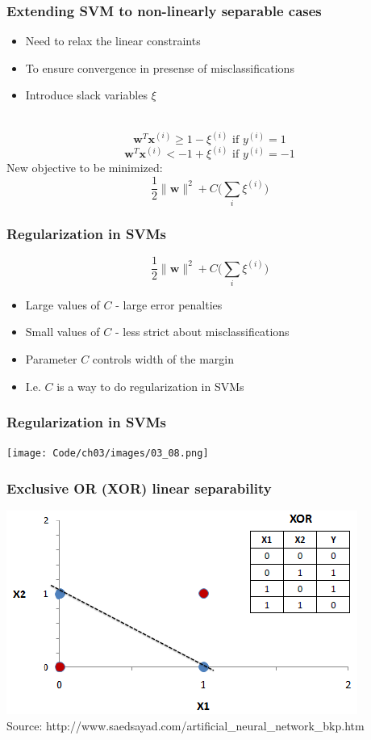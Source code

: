\documentclass{beamer}
\begin{document}
\begin{frame}
  \frametitle{Extending SVM to non-linearly separable cases}
  \begin{itemize}
  \item Need to relax the linear constraints
  \item To ensure convergence in presense of misclassifications
  \item Introduce slack variables $\xi$
  \end{itemize}
  \\
  \[
  \mathbf{w}^T \mathbf{x}^{(i)} \ge 1 - \xi^{(i)} \text{ if } y^{(i)} = 1
  \]
  \[
  \mathbf{w}^T \mathbf{x}^{(i)} < -1 + \xi^{(i)} \text{ if } y^{(i)} = -1
  \]
  New objective to be minimized:
  \[
  \frac{1}{2} \lVert \mathbf{w} \rVert^2 + C \Big(\sum_i \xi^{(i)} \Big)
  \]
\end{frame}

\begin{frame}
  \frametitle{Regularization in SVMs}
  \[
  \frac{1}{2} \lVert \mathbf{w} \rVert^2 + C \Big(\sum_i \xi^{(i)} \Big)
  \]
  \begin{itemize}
  \item Large values of $C$ - large error penalties
  \item Small values of $C$ - less strict about misclassifications
  \item Parameter $C$ controls width of the margin
  \item I.e. $C$ is a way to do regularization in SVMs
  \end{itemize}
\end{frame}

\begin{frame}
  \frametitle{Regularization in SVMs}
  \texttt{[image: Code/ch03/images/03\_08.png]}
\end{frame}

\begin{frame}
  \frametitle{Exclusive OR (XOR) linear separability}
  \includegraphics[width=\textwidth]{Images/xor.png}
  \\
  \tiny{Source: http://www.saedsayad.com/artificial\_neural\_network\_bkp.htm}
\end{frame}
\end{document}
